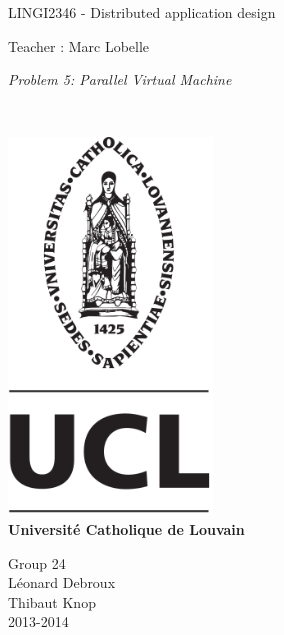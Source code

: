 \documentclass{article}
\begin{document}
\begin{titlepage}
    \begin{center}
        {\huge LINGI2346 - Distributed application design}\\
        \vspace{0.4cm}
        
        {\Large {Teacher : Marc Lobelle}}\\
        \vspace{0.6cm}
        
        {\Large \textit{Problem 5: Parallel Virtual Machine}}\\
        \vspace{1.2cm}

        \texttt{}\\
        \vspace{0.2cm}

        \includegraphics[height=10cm]{pageGarde.png}\\
        \vspace{0.1cm}
        {\Large \textbf{Universit\'e Catholique de Louvain}}
        \vspace{0.3cm}

        \vspace{2cm}
        Group 24\\
        \vspace{0.3cm}
        Léonard Debroux\\
        Thibaut Knop\\
        \vspace{0.4cm}
        2013-2014\\
    \end{center}
\end{titlepage}
\end{document}
